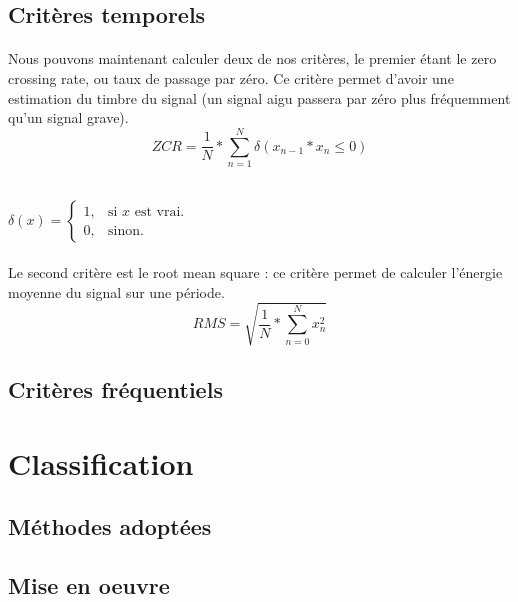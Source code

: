 \documentclass[soumission]{ir}
\begin{document}
\subsection{Critères temporels}
\paragraph{}
Nous pouvons maintenant calculer deux de nos critères, le premier étant le zero crossing rate, ou taux de 
passage par zéro. Ce critère permet d’avoir une estimation du timbre du signal (un signal aigu passera par 
zéro plus fréquemment qu’un signal grave).
\begin{equation}
    ZCR = \frac{1}{N}*\sum_{n = 1}^{N} \delta( x_{n-1}*x_n \leqslant 0 )
\end{equation}

\\

$\delta(x)=\begin{cases}
    1, & \text{si $x$ est vrai}.\\
    0, & \text{sinon}.
\end{cases}$

\paragraph{}
Le second critère est le root mean square : ce critère permet de calculer l'énergie moyenne du signal sur une période.
\begin{equation}
    RMS = \sqrt{\frac{1}{N}*\sum_{n = 0}^{N} x_n^2}
\end{equation}

\subsection{Critères fréquentiels}

\section{Classification}

\subsection{Méthodes adoptées}

\subsection{Mise en oeuvre}
\end{document}
